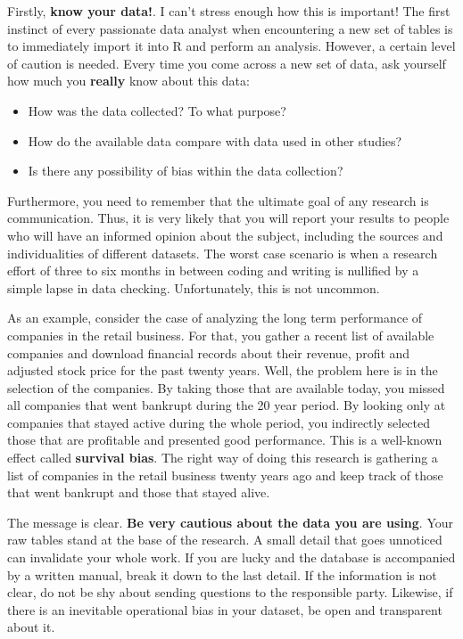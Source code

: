 \documentclass[
  12pt,
]{book}
\providecommand{\tightlist}{%
  \setlength{\itemsep}{0pt}\setlength{\parskip}{0pt}}
\begin{document}
Firstly, \textbf{know your data!}. I can't stress enough how this is important! The first instinct of every passionate data analyst when encountering a new set of tables is to immediately import it into R and perform an analysis. However, a certain level of caution is needed. Every time you come across a new set of data, ask yourself how much you \textbf{really} know about this data:

\begin{itemize}
\tightlist
\item
  How was the data collected? To what purpose?
\item
  How do the available data compare with data used in other studies?
\item
  Is there any possibility of bias within the data collection?
\end{itemize}

Furthermore, you need to remember that the ultimate goal of any research is communication. Thus, it is very likely that you will report your results to people who will have an informed opinion about the subject, including the sources and individualities of different datasets. The worst case scenario is when a research effort of three to six months in between coding and writing is nullified by a simple lapse in data checking. Unfortunately, this is not uncommon.

As an example, consider the case of analyzing the long term performance of companies in the retail business. For that, you gather a recent list of available companies and download financial records about their revenue, profit and adjusted stock price for the past twenty years. Well, the problem here is in the selection of the companies. By taking those that are available today, you missed all companies that went bankrupt during the 20 year period. By looking only at companies that stayed active during the whole period, you indirectly selected those that are profitable and presented good performance. This is a well-known effect called \textbf{survival bias}. The right way of doing this research is gathering a list of companies in the retail business twenty years ago and keep track of those that went bankrupt and those that stayed alive.

The message is clear. \textbf{Be very cautious about the data you are using}. Your raw tables stand at the base of the research. A small detail that goes unnoticed can invalidate your whole work. If you are lucky and the database is accompanied by a written manual, break it down to the last detail. If the information is not clear, do not be shy about sending questions to the responsible party. Likewise, if there is an inevitable operational bias in your dataset, be open and transparent about it.
\end{document}
